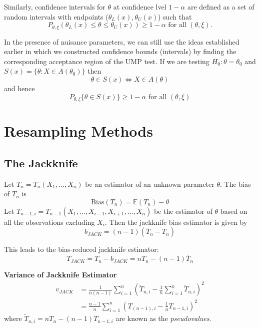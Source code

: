 \documentclass[12pt]{article}
\newcommand{\E}{\mathbb{E}}
\newcommand{\sumn}{\sum_{i=1}^n}
\newcommand{\Bias}{\text{Bias}}
\numberwithin{equation}{section}
\begin{document}
Similarly, confidence intervals for $\theta$ at confidence lvel $1 - \alpha$ are defined as a set of random intervals with endpoints ($\theta_L(x), \theta_U(x)$) such that
\begin{equation*}
  P_{\theta, \xi}(\theta_L(x) \le \theta \le \theta_U(x)) \ge 1 - \alpha \text{ for all } (\theta, \xi).
\end{equation*}

In the presence of nuisance parameters, we can still use the ideas established earlier in which we constructed confidence bounds (intervals) by finding the corresponding acceptance region of the UMP test. If we are testing $H_0 : \theta = \theta_0$ and $S(x) = \{\theta : X \in A(\theta_0) \}$ then
\begin{equation*}
  \theta \in S(x) \iff X \in A(\theta)
\end{equation*}
and hence
\begin{equation*}
  P_{\theta, \xi} \{\theta \in S(x) \} \ge 1 - \alpha \text{ for all } (\theta, \xi)
\end{equation*}





\newpage
\section{Resampling Methods}
\subsection{The Jackknife}
Let $T_n = T_n(X_1, \ldots, X_n)$ be an estimator of an unknown parameter $\theta$. The bias of $T_n$ is
\begin{equation*}
  \Bias(T_n) = \E(T_n) - \theta
\end{equation*}
%
Let $T_{n-1, i} = T_{n-1}(X_1, \ldots, X_{i-1}, X_{i+1}, \ldots, X_n)$ be the estimator of $\theta$ based on all the observations excluding $X_i$. Then the jackknife bias estimator is given by
\begin{equation*}
  b_{JACK} = (n-1)(\bar{T}_n - T_n)
\end{equation*}

This leads to the bias-reduced jackknife estimator:
\begin{equation*}
  T_{JACK} = T_n - b_{JACK} = n T_n - (n-1) \bar{T}_n
\end{equation*}

\textbf{Variance of Jackknife Estimator}
\begin{align*}
  v_{JACK} &= \frac{1}{n(n-1)} \sumn \left(
    \tilde{T}_{n, i} - \frac{1}{n} \sumn \tilde{T}_{n, i}
  \right) ^ 2 \\
  &= \frac{n-1}{n} \sumn \left(
    T_{(n-1), i} - \frac{1}{n} T_{n-1, i}
  \right) ^ 2
\end{align*}
where $\tilde{T}_{n, i} = n T_n - (n - 1) T_{n-1, i}$ are known as the \textit{pseudovalues}.
\end{document}
